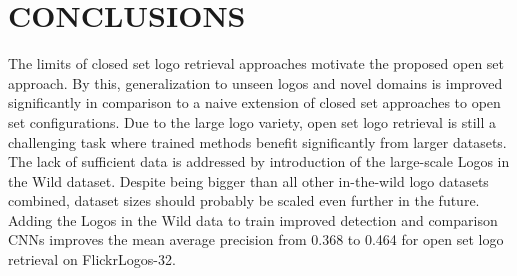 \documentclass[a4paper,twoside]{article}
\begin{document}
%

\section{\uppercase{Conclusions}}
\label{sec:conclusion}
\noindent The limits of closed set logo retrieval approaches motivate the proposed open set approach. By this, generalization to unseen logos and novel domains is improved significantly in comparison to a naive extension of closed set approaches to open set configurations. 
Due to the large logo variety, open set logo retrieval is still a challenging task where trained methods benefit significantly from larger datasets. The lack of sufficient data is addressed by introduction of the large-scale Logos in the Wild dataset. Despite being bigger than all other in-the-wild logo datasets combined, dataset sizes should probably be scaled even further in the future. Adding the Logos in the Wild data to train improved detection and comparison \acp{CNN} improves the mean average precision from 0.368 to 0.464 for open set logo retrieval on FlickrLogos-32.





\vfill

{\small
}

\vfill
\end{document}
